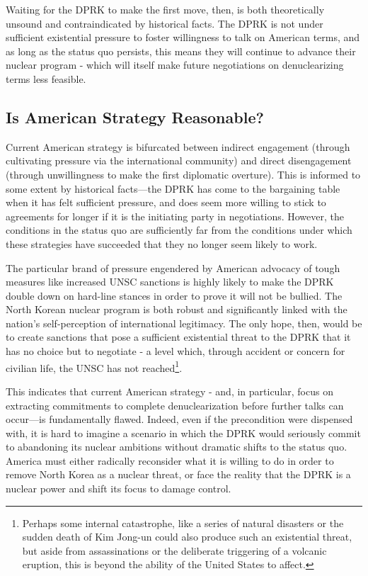Waiting for the DPRK to make the first move, then, is both theoretically unsound and contraindicated by historical facts. The DPRK is not under sufficient existential pressure to foster willingness to talk on American terms, and as long as the status quo persists, this means they will continue to advance their nuclear program - which will itself make future negotiations on denuclearizing terms less feasible.

\subsection{Is American Strategy Reasonable?}

Current American strategy is bifurcated between indirect engagement (through cultivating pressure via the international community) and direct disengagement (through unwillingness to make the first diplomatic overture). This is informed to some extent by historical facts---the DPRK has come to the bargaining table when it has felt sufficient pressure, and does seem more willing to stick to agreements for longer if it is the initiating party in negotiations. However, the conditions in the status quo are sufficiently far from the conditions under which these strategies have succeeded that they no longer seem likely to work.

The particular brand of pressure engendered by American advocacy of tough measures like increased UNSC sanctions is highly likely to make the DPRK double down on hard-line stances in order to prove it will not be bullied. The North Korean nuclear program is both robust and significantly linked with the nation's self-perception of international legitimacy. The only hope, then, would be to create sanctions that pose a sufficient existential threat to the DPRK that it has no choice but to negotiate - a level which, through accident or concern for civilian life, the UNSC has not reached\footnote{Perhaps some internal catastrophe, like a series of natural disasters or the sudden death of Kim Jong-un could also produce such an existential threat, but aside from assassinations or the deliberate triggering of a volcanic eruption, this is beyond the ability of the United States to affect.}. 

This indicates that current American strategy - and, in particular, focus on extracting commitments to complete denuclearization before further talks can occur---is fundamentally flawed. Indeed, even if the precondition were dispensed with, it is hard to imagine a scenario in which the DPRK would seriously commit to abandoning its nuclear ambitions without dramatic shifts to the status quo. America must either radically reconsider what it is willing to do in order to remove North Korea as a nuclear threat, or face the reality that the DPRK is a nuclear power and shift its focus to damage control.
